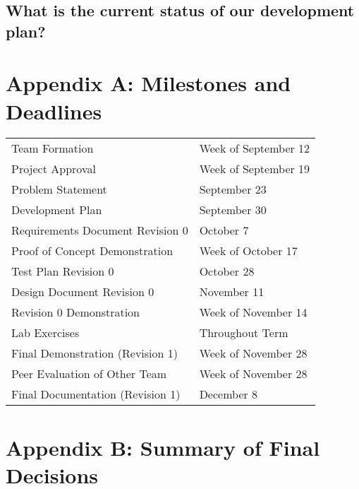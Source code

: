 \documentclass[11pt]{meetingmins}
\begin{document}
	\subsection{What is the current status of our development plan?}

		

	\vspace{1em}

\newpage
\section{Appendix A: Milestones and Deadlines}
\begin{tabular}{ p{6.7cm} l}

  Team Formation & Week of September 12\\

  Project Approval & Week of September 19\\

  Problem Statement & September 23\\

  Development Plan & September 30\\

  Requirements Document Revision 0 & October 7\\

  Proof of Concept Demonstration & Week of October 17\\

  Test Plan Revision 0 & October 28\\

  Design Document Revision 0 & November 11\\

  Revision 0 Demonstration & Week of November 14\\

  Lab Exercises & Throughout Term\\

  Final Demonstration (Revision 1) & Week of November 28\\

  Peer Evaluation of Other Team & Week of November 28\\

  Final Documentation (Revision 1) & December 8\\

\end{tabular}

\newpage
\section{Appendix B: Summary of Final Decisions}
\end{document}
